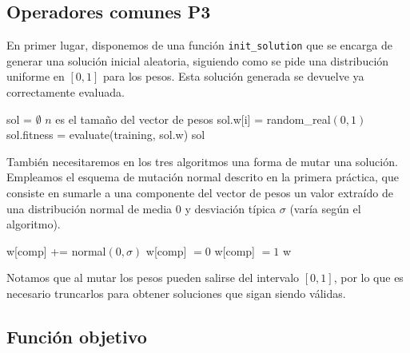 \documentclass[12pt]{article}
\begin{document}
\subsection*{Operadores comunes P3}
\label{op_comunes}

En primer lugar, disponemos de una función \verb|init_solution| que se encarga de generar una solución inicial aleatoria, siguiendo como se pide una distribución uniforme en $[0, 1]$ para los pesos. Esta solución generada se devuelve ya correctamente evaluada.

\begin{algorithm}[h!]
\begin{algorithmic}

    \State sol = $\emptyset$
      \Comment $n$ es el tamaño del vector de pesos
        \State sol.w[i] = random\_real$(0,1)$
    \EndFor
    \State sol.fitness = evaluate(training, sol.w) 
\State \Return sol
\EndFunction

\end{algorithmic}
\end{algorithm}

También necesitaremos en los tres algoritmos una forma de mutar una solución. Empleamos el esquema de mutación normal descrito en la primera práctica, que consiste en sumarle a una componente del vector de pesos un valor extraído de una distribución normal de media $0$ y desviación típica $\sigma$ (varía según el algoritmo).\\

\begin{algorithm}[ht]
\begin{algorithmic}

    \State w[comp] += normal$(0, \sigma)$
        \State w[comp] $= 0$
    \EndIf
        \State w[comp] $= 1$
    \EndIf
\State \Return w
\EndFunction

\end{algorithmic}
\end{algorithm}

Notamos que al mutar los pesos pueden salirse del intervalo $[0,1]$, por lo que es necesario truncarlos para obtener soluciones que sigan siendo válidas.\\

\subsection*{{\color{red}Función objetivo}}
\end{document}
